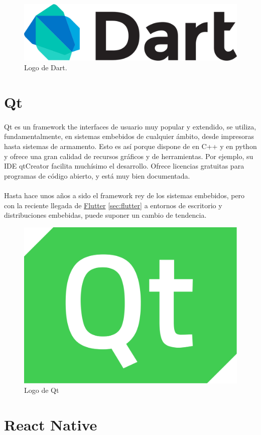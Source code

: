 \begin{figure}[H]
	\centering
	\includegraphics[width=0.50\linewidth]{imgs/dart-logo}
	\caption[Dart Logo]{Logo de Dart.}
	\label{fig:dart}
\end{figure}

\section{Qt}\label{sec:Qt}

\paragraph{}Qt es un \gls{framework} the interfaces de usuario muy popular y extendido,
se utiliza, fundamentalmente, en sistemas embebidos de cualquier ámbito, desde impresoras
hasta sistemas de armamento. Esto es así porque dispone de  en C++ y en
python y ofrece una gran calidad de recursos gráficos y de herramientas. Por ejemplo,
su \gls{IDE} qtCreator facilita muchísimo el desarrollo. Ofrece licencias gratuitas para
programas de código abierto, y está muy bien documentada.

\paragraph{}Hasta hace unos años a sido el framework rey de los sistemas embebidos, pero
con la reciente llegada de \hyperref[sec:flutter]{Flutter} \ref{sec:flutter} a entornos
de escritorio y distribuciones embebidas, puede suponer un cambio de tendencia.

\begin{figure}[H]
	\centering
	\includegraphics[width=0.30\linewidth]{imgs/qt}
	\caption[Qt Logo]{Logo de Qt}
	\label{fig:qt}
\end{figure}


\section{React Native}\label{sec:react}


